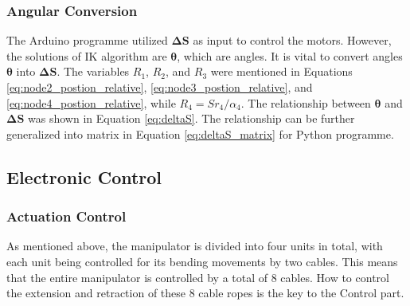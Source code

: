 \subsubsection{Angular Conversion}
The Arduino programme utilized $\boldsymbol{\Delta S}$ as input to control the motors. However, the solutions of IK 
algorithm are $\boldsymbol{\theta}$, which are angles. It is vital to convert angles $\boldsymbol{\theta}$ 
into $\boldsymbol{\Delta S}$. The variables $R_1$, $R_2$, and $R_3$ were mentioned in Equations 
\ref{eq:node2_postion_relative}, \ref{eq:node3_postion_relative}, and \ref{eq:node4_postion_relative}, while 
$R_4 = {Sr}_4/ \alpha_4$. The relationship between $\boldsymbol{\theta}$ and $\boldsymbol{\Delta S}$ was shown in 
Equation \ref{eq:deltaS}. The relationship can be further generalized into matrix in Equation \ref{eq:deltaS_matrix} 
for Python programme.
\vspace{-5mm}

\subsection{Electronic Control}
\subsubsection{Actuation Control}
As mentioned above, the manipulator is divided into four units in total, with each unit being controlled for its 
bending movements by two cables. This means that the entire manipulator is controlled by a total of 8 cables. How 
to control the extension and retraction of these 8 cable ropes is the key to the Control part. 

